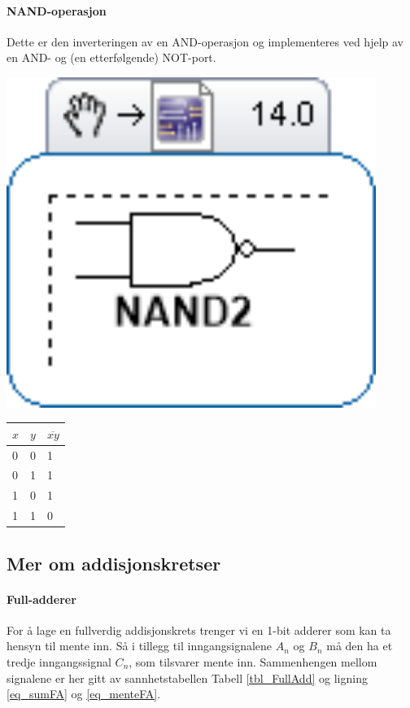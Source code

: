 \documentclass[11pt, a4paper, norwegian]{article}
\begin{document}
\paragraph{NAND-operasjon}
Dette er den inverteringen av en AND-operasjon og implementeres ved hjelp av en AND- og (en etterfølgende) NOT-port. 

{\centering
\begin{minipage}{0.45\textwidth}
  \centering
  \includegraphics[width=0.9\textwidth]{port_nand.png}
  \label{fig_nand}
\end{minipage}
\begin{minipage}{0.45\textwidth}
  \centering
  \label{tbl_nand}
  \begin{tabular}{|l|l||l|}
        \hline
        $x$ & $y$ 	& $\overline{xy}$ \\ 	\hline
        0 	& 0 	& 1\\
        0 	& 1 	& 1\\
        1 	& 0 	& 1\\
        1 	& 1 	& 0\\ \hline
  \end{tabular}
\end{minipage}
\endgraf\bigskip
}


\subsection{Mer om addisjonskretser} \label{append_addisjon}
\paragraph{Full-adderer}
For å lage en fullverdig addisjonskrets trenger vi en 1-bit adderer som kan ta hensyn til mente inn. Så i tillegg til inngangsignalene $A_n$ og $B_n$ må den ha et tredje inngangssignal $C_n$, som tilsvarer mente inn. Sammenhengen mellom signalene er her gitt av sannhetstabellen Tabell \ref{tbl_FullAdd} og ligning \ref{eq_sumFA} og \ref{eq_menteFA}. 
\end{document}

